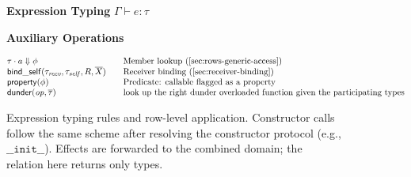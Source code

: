 \begin{figure}[t]
\centering
\begin{minipage}{\linewidth}
\small
\textbf{Expression Typing } \(\Gamma \vdash e : \tau\)

\medskip
{}

\medskip
\textbf{Auxiliary Operations}

\[
\begin{array}{@{}l@{\qquad}l@{}}
\tau \cdot a \Downarrow \phi & \text{Member lookup (\cref{sec:rows-generic-access})} \\
\mathsf{bind\_self}(\tau_{\mathit{recv}}, \tau_{\mathit{self}}, R, \overline{X})
  & \text{Receiver binding (\cref{sec:receiver-binding})} \\
\mathsf{property}(\phi)
  & \text{Predicate: callable flagged as a property} \\ 
\mathsf{dunder}(\mathit{op},\overline{\tau})
  & \text{look up the right dunder overloaded function given the participating types}
\end{array}
\]
\end{minipage}
\caption{Expression typing rules and row-level application. Constructor calls follow the same scheme after resolving the constructor protocol (e.g., \(\mathtt{\_\_init\_\_}\)). Effects are forwarded to the combined domain; the relation here returns only types.}
\label{fig:typing-rules}
\end{figure}


